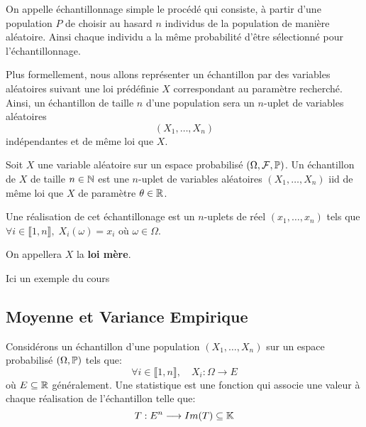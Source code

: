 \begin{definition}
    On appelle échantillonnage simple le procédé qui consiste, à partir d'une population $P$ de 
    choisir au hasard $n$ individus de la population de manière aléatoire. 
    Ainsi chaque individu a la même probabilité d'être sélectionné pour l'échantillonnage. 
\end{definition}

Plus formellement, nous allons représenter un échantillon par des variables aléatoires suivant une 
loi prédéfinie $X$ correspondant au paramètre recherché. Ainsi, un échantillon de taille $n$ d'une population sera un $n$-uplet de variables aléatoires 
    \[ (X_1, \dots, X_n) \]
indépendantes et de même loi que $X$. 

\begin{definition}
    Soit $X$ une variable aléatoire sur un espace probabilisé $(\Omega, \mathcal{F}, \mathbb{P})$. 
    Un échantillon de $X$ de taille $n \in \mathbb{N}$ est une $n$-uplet de variables aléatoires 
    $(X_1, \dots, X_n)$ iid de même loi que $X$ de paramètre $\theta \in \mathbb{R}$. 

    \vspace{0.3cm}

    Une réalisation de cet échantillonage est un $n$-uplets de réel $(x_1, \dots, x_n)$ tels que 
    $ \forall i \in \llbracket 1, n \rrbracket, \; X_i(\omega) = x_i$ où $ \omega \in \Omega$. 
\end{definition}

\begin{remark}
    On appellera $X$ la \textbf{loi mère}. 
\end{remark}

\begin{example}
    Ici un exemple du cours
\end{example}

\subsection{Moyenne et Variance Empirique}

\begin{definition}[Statistique]
    Considérons un échantillon d'une population $(X_1, \dots, X_n)$ sur un espace probabilisé 
    $(\Omega, \mathbb{P} )$ tels que: 
        \[ \forall i \in \llbracket 1, n \rrbracket, \quad X_i : \Omega \longrightarrow E \]
    où $E \subseteq \mathbb{R}$ généralement.  
    Une statistique est une fonction qui associe une valeur à chaque réalisation de l'échantillon telle que: 
        \[ T : E^n \longrightarrow Im(T) \subseteq \mathbb{K} \] 
\end{definition}

